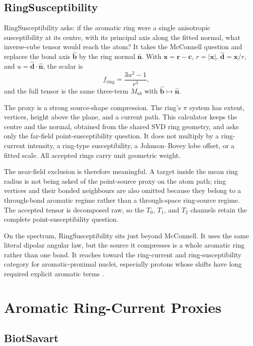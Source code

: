 \documentclass[11pt]{article}
\begin{document}
\subsection{RingSusceptibility}

RingSusceptibility asks: if the aromatic ring were a single anisotropic
susceptibility at its centre, with its principal axis along the fitted normal,
what inverse-cube tensor would reach the atom? It takes the McConnell question
and replaces the bond axis \(\hat{\bm b}\) by the ring normal
\(\hat{\bm n}\). With \(\bm x=\bm r-\bm c\), \(r=|\bm x|\),
\(\hat{\bm d}=\bm x/r\), and \(u=\hat{\bm d}\cdot\hat{\bm n}\), the scalar is
\[
  f_{\mathrm{ring}}=\frac{3u^2-1}{r^3},
\]
and the full tensor is the same three-term \(M_{ab}\) with
\(\hat{\bm b}\mapsto\hat{\bm n}\).

The proxy is a strong source-shape compression. The ring's \(\pi\) system has
extent, vertices, height above the plane, and a current path. This calculator
keeps the centre and the normal, obtained from the shared SVD ring geometry,
and asks only the far-field point-susceptibility question. It does not multiply
by a ring-current intensity, a ring-type susceptibility, a Johnson--Bovey lobe
offset, or a fitted scale. All accepted rings carry unit geometric weight.

The near-field exclusion is therefore meaningful. A target inside the mean ring
radius is not being asked of the point-source proxy on the atom path; ring
vertices and their bonded neighbours are also omitted because they belong to a
through-bond aromatic regime rather than a through-space ring-source regime.
The accepted tensor is decomposed raw, so the \(T_0\), \(T_1\), and \(T_2\)
channels retain the complete point-susceptibility question.

On the spectrum, RingSusceptibility sits just beyond McConnell. It uses the
same literal dipolar angular law, but the source it compresses is a whole
aromatic ring rather than one bond. It reaches toward the ring-current and
ring-susceptibility category for aromatic-proximal nuclei, especially protons
whose shifts have long required explicit aromatic terms
\cite{pople1956,case1995,christensen2011}.

\section{Aromatic Ring-Current Proxies}

\subsection{BiotSavart}
\end{document}
